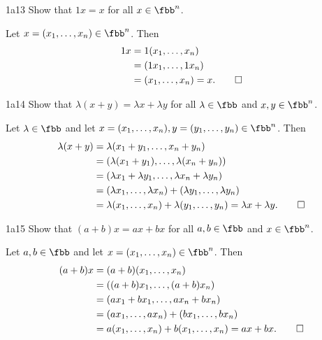 \begin{exercise}{1a13}
    Show that $1x = x$ for all $x \in \fbb^n$.
\end{exercise}

\begin{sol}
    Let $x = (x_1, \dots, x_n) \in \fbb^n$.
    Then
    \begin{align*}
        1x &= 1(x_1, \dots, x_n) \\
        &= (1x_1, \dots, 1x_n) \\
        &= (x_1, \dots, x_n) = x. \qedhere
    \end{align*}
\end{sol}

\begin{exercise}{1a14}
    Show that $\lambda(x + y) = \lambda x + \lambda y$ for all $\lambda \in \fbb$ and $x, y \in \fbb^n$.
\end{exercise}

\begin{sol}
    Let $\lambda \in \fbb$ and let $x = (x_1, \dots, x_n), y = (y_1, \dots, y_n) \in \fbb^n$.
    Then
    \begin{align*}
        \lambda(x + y) &= \lambda(x_1 + y_1, \dots, x_n + y_n) \\
        &= (\lambda(x_1 + y_1), \dots, \lambda(x_n + y_n)) \\
        &= (\lambda x_1 + \lambda y_1, \dots, \lambda x_n + \lambda y_n) \\
        &= (\lambda x_1, \dots, \lambda x_n) + (\lambda y_1, \dots, \lambda y_n) \\
        &= \lambda(x_1, \dots, x_n) + \lambda(y_1, \dots, y_n) = \lambda x + \lambda y. \qedhere
    \end{align*}
\end{sol}

\begin{exercise}{1a15}
    Show that $(a + b)x = ax + bx$ for all $a, b \in \fbb$ and $x \in \fbb^n$.
\end{exercise}

\begin{sol}
    Let $a, b \in \fbb$ and let $x = (x_1, \dots, x_n) \in \fbb^n$.
    Then
    \begin{align*}
        (a + b)x &= (a + b)(x_1, \dots, x_n) \\
        &= ((a + b)x_1, \dots, (a + b)x_n) \\
        &= (ax_1 + bx_1, \dots, ax_n + bx_n) \\
        &= (ax_1, \dots, ax_n) + (bx_1, \dots, bx_n) \\
        &= a(x_1, \dots, x_n) + b(x_1, \dots, x_n) = ax + bx. \qedhere
    \end{align*}
\end{sol}